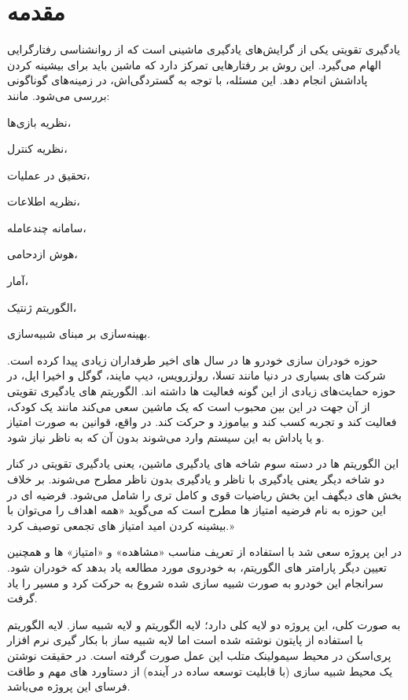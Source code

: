 \chapter{مقدمه}

یادگیری تقویتی یکی از گرایش‌های یادگیری ماشینی است که از روانشناسی رفتارگرایی الهام می‌گیرد. این روش بر رفتارهایی تمرکز دارد که ماشین باید برای بیشینه کردن پاداشش انجام دهد. این مسئله، با توجه به گستردگی‌اش، در زمینه‌های گوناگونی بررسی می‌شود. مانند: 
\begin{alphinline}
	\item
	نظریه بازی‌ها،
	\item  
	نظریه کنترل، 
	\item 
	تحقیق در عملیات،
	 \item 
	نظریه اطلاعات، 
	\item 
	سامانه چندعامله، 
	\item 
	هوش ازدحامی، 
	\item 
	آمار، 
	\item 
	الگوریتم ژنتیک، 
	\item
	بهینه‌سازی بر مبنای شبیه‌سازی. 
	
\end{alphinline}

حوزه خودران سازی خودرو ها در سال های اخیر طرفداران زیادی پیدا کرده است. شرکت های بسیاری در دنیا مانند تسلا، رولزرویس، دیپ مایند، گوگل و اخیرا اپل، در حوزه حمایت‌های زیادی از این گونه فعالیت ها داشته اند. الگوریتم های یادگیری تقویتی از آن جهت در این بین محبوب است که یک ماشین سعی می‌کند مانند یک کودک، فعالیت کند و تجربه کسب کند و بیاموزد و حرکت کند. در واقع، قوانین به صورت امتیاز و یا پاداش به این سیستم وارد می‌شوند بدون آن که به ناظر نیاز شود.

این الگوریتم ها در دسته سوم شاخه های یادگیری ماشین، یعنی یادگیری تقویتی در کنار دو شاخه دیگر یعنی یادگیری با ناظر و یادگیری بدون ناظر مطرح می‌شوند. بر خلاف بخش های دیگهف این بخش ریاضیات قوی و کامل تری را شامل می‌شود. فرضیه ای در این حوزه به نام فرضیه امتیاز ها مطرح است که می‌گوید «همه اهداف را می‌توان با بیشینه کردن امید امتیاز های تجمعی توصیف کرد.»

در این پروژه سعی شد با استفاده از تعریف مناسب «مشاهده» و «امتیاز» ها و همچنین تعیین دیگر پارامتر های الگوریتم، به خودروی مورد مطالعه یاد بدهد که خودران شود. سرانجام این خودرو به صورت شبیه سازی شده شروع به حرکت کرد و مسیر را یاد گرفت.

به صورت کلی، این پروژه دو لایه کلی دارد؛ لایه الگوریتم و لایه شبیه ساز. 
لایه الگوریتم با استفاده از پایتون نوشته شده است اما لایه شبیه ساز با بکار گیری نرم افزار پری‌اسکن در محیط سیمولینک متلب این عمل صورت گرفته است. در حقیقت نوشتن یک محیط شبیه سازی (با قابلیت توسعه ساده در آینده)
از دستاورد های مهم و طاقت فرسای این پروژه می‌باشد.



